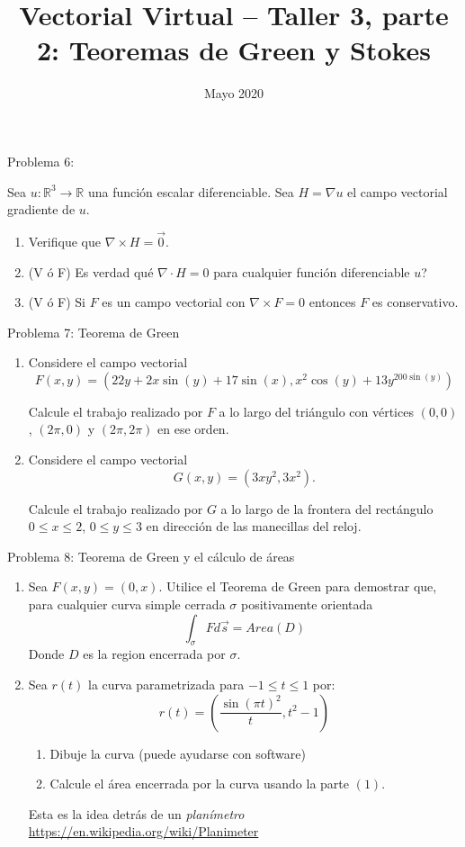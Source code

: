 \documentclass[usepdftitle=false]{beamer}
\title[]{Vectorial Virtual -- Taller 3, parte 2: Teoremas de Green y Stokes}
\date{Mayo 2020}
\begin{document}
\begin{frame}{Problema 6:}

Sea $u:\mathbb{R}^3\rightarrow \mathbb{R}$ una funci\'on escalar diferenciable. Sea $H=\nabla u$ el campo vectorial gradiente de $u$. 

\begin{enumerate}
\item Verifique que $\nabla \times H= \vec{0}$.
\item (V \'o F) Es verdad qu\'e $\nabla\cdot H = 0$ para cualquier funci\'on diferenciable $u$?
\item (V \'o F) Si $F$ es un campo vectorial con $\nabla \times F=0$ entonces $F$ es conservativo.

\end{enumerate}

\end{frame}

\begin{frame}{Problema 7: Teorema de Green}

\begin{enumerate}
\item Considere el campo vectorial 
\[F(x,y)=(22y+2x\sin(y)+17\sin(x),x^2\cos(y)+13y^{200\sin(y)})\]

Calcule el trabajo realizado por $F$ a lo largo del tri\'angulo con v\'ertices $(0,0)$, $(2\pi,0)$ y $(2\pi,2\pi)$ en ese orden.

\item Considere el campo vectorial \[G(x,y)=(3xy^2, 3x^2).\] 

Calcule el trabajo realizado por $G$ a lo largo de la frontera del rect\'angulo $0\leq x\leq 2$, $0\leq y\leq 3$ en direcci\'on de las manecillas del reloj.

\end{enumerate}

\end{frame}


\begin{frame}{Problema 8: Teorema de Green y el c\'alculo de \'areas} 

\begin{enumerate}
\item Sea $F(x,y)=(0,x)$. Utilice el Teorema de Green para demostrar que, para cualquier curva simple cerrada $\sigma$ positivamente orientada 
\[\int_{\sigma} Fd\vec{s} = Area(D)\]
Donde $D$ es la region encerrada por $\sigma$.
\item Sea $r(t)$ la curva parametrizada para $-1\leq t\leq 1$ por:
\[r(t)=\left(\frac{\sin(\pi t)^2}{t}, t^2-1\right)\]
\begin{enumerate}
\item Dibuje la curva (puede ayudarse con software)
\item Calcule el \'area encerrada por la curva usando la parte $(1)$.
\end{enumerate}

Esta es la idea detr\'as de un {\it plan\'imetro}
\url{https://en.wikipedia.org/wiki/Planimeter}

\end{enumerate}
 
 
 
 
\end{frame}
\end{document}

